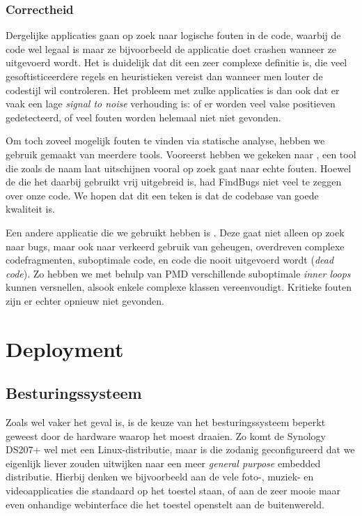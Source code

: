 \subsection{Correctheid}
\label{server:realisatie:codeanalyse:correctheid}

Dergelijke applicaties gaan op zoek naar logische fouten in de code, waarbij de code wel legaal is maar ze bijvoorbeeld de applicatie doet crashen wanneer ze uitgevoerd wordt. Het is duidelijk dat dit een zeer complexe definitie is, die veel gesoftisticeerdere regels en heuristieken vereist dan wanneer men louter de codestijl wil controleren. Het probleem met zulke applicaties is dan ook dat er vaak een lage \emph{signal to noise} verhouding is: of er worden veel valse positieven gedetecteerd, of veel fouten worden helemaal niet niet gevonden.

Om toch zoveel mogelijk fouten te vinden via statische analyse, hebben we gebruik gemaakt van meerdere tools. Vooreerst hebben we gekeken naar , een tool die zoals de naam laat uitschijnen vooral op zoek gaat naar echte fouten. Hoewel de  die het daarbij gebruikt vrij uitgebreid is, had FindBugs niet veel te zeggen over onze code. We hopen dat dit een teken is dat de codebase van goede kwaliteit is.

Een andere applicatie die we gebruikt hebben is . Deze gaat niet alleen op zoek naar bugs, maar ook naar verkeerd gebruik van geheugen, overdreven complexe codefragmenten, suboptimale code, en code die nooit uitgevoerd wordt (\emph{dead code}). Zo hebben we met behulp van PMD verschillende suboptimale \emph{inner loops} kunnen versnellen, alsook enkele complexe klassen vereenvoudigt. Kritieke fouten zijn er echter opnieuw niet gevonden.

\chapter{Deployment}
\label{server:deployment}

\section{Besturingssysteem}
\label{server:deployment:besturingssysteem}

Zoals wel vaker het geval is, is de keuze van het besturingssysteem beperkt geweest door de hardware waarop het moest draaien. Zo komt de Synology DS207+ wel met een Linux-distributie, maar is die zodanig geconfigureerd dat we eigenlijk liever zouden uitwijken naar een meer \emph{general purpose} embedded distributie. Hierbij denken we bijvoorbeeld aan de vele foto-, muziek- en videoapplicaties die standaard op het toestel staan, of aan de zeer mooie maar even onhandige webinterface die het toestel openstelt aan de buitenwereld.

